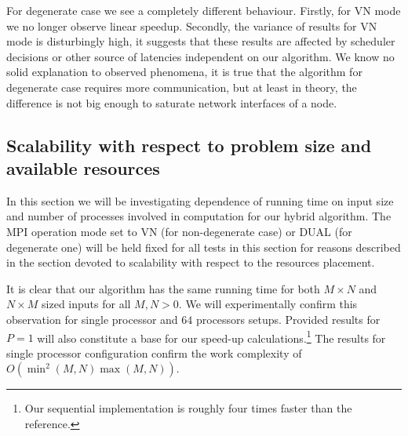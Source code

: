 For degenerate case we see a completely different behaviour.
Firstly, for VN mode we no longer observe linear speedup.
Secondly, the variance of results for VN mode is disturbingly high, it suggests that these results are affected by scheduler decisions or other source of latencies independent on our algorithm.
We know no solid explanation to observed phenomena, it is true that the algorithm for degenerate case requires more communication, but at least in theory, the difference is not big enough to saturate network interfaces of a node.

\subsection*{Scalability with respect to problem size and available resources}

In this section we will be investigating dependence of running time on input size and number of processes involved in computation for our hybrid algorithm.
The MPI operation mode set to VN (for non-degenerate case) or DUAL (for degenerate one) will be held fixed for all tests in this section for reasons described in the section devoted to scalability with respect to the resources placement.

It is clear that our algorithm has the same running time for both $M \times N$ and $N \times M$ sized inputs for all $M, N > 0$.
We will experimentally confirm this observation for single processor and $64$ processors setups.
Provided results for $P = 1$ will also constitute a base for our speed-up calculations.\footnote{Our sequential implementation is roughly four times faster than the reference.}
The results for single processor configuration confirm the work complexity of $O(\min^2(M, N) \max(M, N))$.

